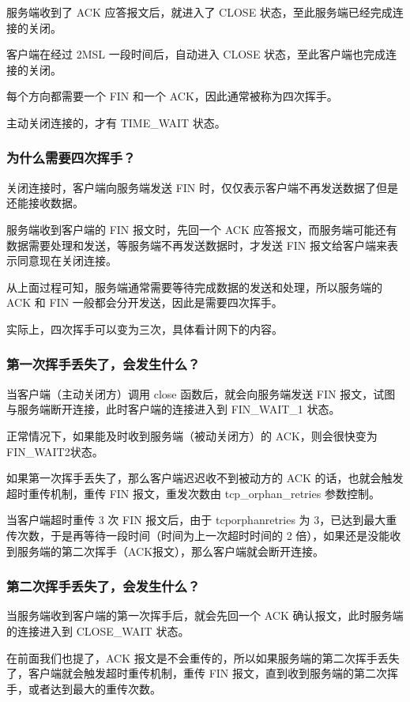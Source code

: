 \documentclass[11pt]{article}
\begin{document}
服务端收到了 ACK 应答报文后，就进入了 CLOSE 状态，至此服务端已经完成连接的关闭。

客户端在经过 2MSL 一段时间后，自动进入 CLOSE 状态，至此客户端也完成连接的关闭。

每个方向都需要一个 FIN 和一个 ACK，因此通常被称为四次挥手。

主动关闭连接的，才有 TIME\_WAIT 状态。
\subsubsection{为什么需要四次挥手？}
\label{sec:orga01986e}
关闭连接时，客户端向服务端发送 FIN 时，仅仅表示客户端不再发送数据了但是还能接收数据。

服务端收到客户端的 FIN 报文时，先回一个 ACK 应答报文，而服务端可能还有数据需要处理和发送，等服务端不再发送数据时，才发送 FIN 报文给客户端来表示同意现在关闭连接。

从上面过程可知，服务端通常需要等待完成数据的发送和处理，所以服务端的 ACK 和 FIN 一般都会分开发送，因此是需要四次挥手。

实际上，四次挥手可以变为三次，具体看计网下的内容。

\subsubsection{第一次挥手丢失了，会发生什么？}
\label{sec:org5498e0a}
当客户端（主动关闭方）调用 close 函数后，就会向服务端发送 FIN 报文，试图与服务端断开连接，此时客户端的连接进入到 FIN\_WAIT\_1 状态。

正常情况下，如果能及时收到服务端（被动关闭方）的 ACK，则会很快变为 FIN\_WAIT2状态。

如果第一次挥手丢失了，那么客户端迟迟收不到被动方的 ACK 的话，也就会触发超时重传机制，重传 FIN 报文，重发次数由 tcp\_orphan\_retries 参数控制。

当客户端超时重传 3 次 FIN 报文后，由于 tcporphanretries 为 3，已达到最大重传次数，于是再等待一段时间（时间为上一次超时时间的 2 倍），如果还是没能收到服务端的第二次挥手（ACK报文），那么客户端就会断开连接。

\subsubsection{第二次挥手丢失了，会发生什么？}
\label{sec:org930e2c5}
当服务端收到客户端的第一次挥手后，就会先回一个 ACK 确认报文，此时服务端的连接进入到 CLOSE\_WAIT 状态。

在前面我们也提了，ACK 报文是不会重传的，所以如果服务端的第二次挥手丢失了，客户端就会触发超时重传机制，重传 FIN 报文，直到收到服务端的第二次挥手，或者达到最大的重传次数。
\end{document}
